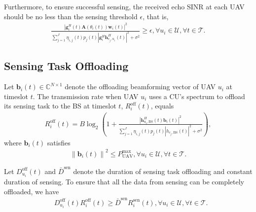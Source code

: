 \documentclass[10pt,journal,compsoc]{IEEEtran}
\begin{document}
Furthermore, to ensure successful sensing, the received echo SINR at each UAV should be no less than the sensing threshold $\epsilon$, that is,
    \begin{equation}\label{P0:Sensing-SINR}
    \begin{array}{l}
    \frac{\left|\bm{g}^{H}_{i}(t)\mathbf{A}(\theta_{i}(t)) \bm{w}_{i}(t)\right|^{2}}{\sum \limits_{j = 1 }^{J} \eta_{i, j}(t) p_{j}(t) \left|\bm{g}_{i}^{H}\bm{h}_{c_{j}, u_{i}}^{H}(t)\right|^{2} + \sigma^{2}} \ge \epsilon, \forall u_{i} \in \mathcal{U}, \forall t \in \mathcal{T}.
    \end{array}
    \end{equation}


\subsection{Sensing Task Offloading}
Let $\bm{b}_{i}(t) \in \mathbb{C}^{N \times 1}$ denote the offloading beamforming vector of UAV $u_{i}$ at timeslot $t$. The transmission rate when UAV $u_{i}$ uses a CU's spectrum to offload its sensing task to the BS at timeslot $t$, $R_{i}^{\text{off}}(t)$, equals
    \begin{equation}\label{eq:UAV-Offloading-Rate}
    \begin{array}{l}
    R_{i}^{\text{off}}(t) = B \log_2 \left( 1 + \frac{\left|\bm{h}^{H}_{u_{i}, \text{BS}}(t)\bm{b}_{i}(t)\right|^{2}}{\sum \limits_{j = 1}^{J} \eta_{i, j}(t)p_{j}(t) \left|h_{c_{j}, \text{BS}}(t)\right|^{2} + \sigma^{2}} \right),
    \end{array}
    \end{equation}
where
$\bm{b}_{i}(t)$  satisfies
\begin{align}\label{P0:UAV-Off-Max-Power}
\left\|\bm{b}_{i}(t)\right\|^{2} \le P^{\max}_{\text{UAV}},  \forall u_{i} \in \mathcal{U}, \forall t \in \mathcal{T}.
\end{align}

Let $D_{u_{i}}^{\text{off}}(t)$ and $\bar{D}^{\text{sen}}$ denote the duration of sensing task offloading and constant duration of sensing.
To ensure that all the data from sensing can be completely offloaded, we have
\begin{align}\label{P0:UAVs-task-successful-offloading}
&D_{u_{i}}^{\text{off}}(t)R_{i}^{\text{off}}(t) \ge \bar{D}^{\text{sen}}R_{i}^{\text{sen}}(t), \forall u_{i} \in \mathcal{U}, \forall t \in \mathcal{T}.
\end{align}
\end{document}
